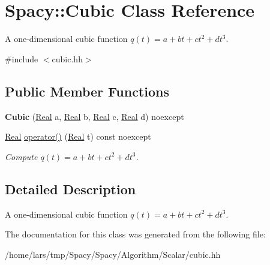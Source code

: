 \hypertarget{classSpacy_1_1Cubic}{}\section{Spacy\+:\+:Cubic Class Reference}
\label{classSpacy_1_1Cubic}


A one-\/dimensional cubic function $q(t) = a + bt + ct^2 + dt^3$.  




{\ttfamily \#include $<$cubic.\+hh$>$}

\subsection*{Public Member Functions}
\begin{DoxyCompactItemize}
\item 
{\bfseries Cubic} (\hyperlink{classSpacy_1_1Real}{Real} a, \hyperlink{classSpacy_1_1Real}{Real} b, \hyperlink{classSpacy_1_1Real}{Real} c, \hyperlink{classSpacy_1_1Real}{Real} d) noexcept\hypertarget{classSpacy_1_1Cubic_aa0893e2540b9f5ac4b85e168c1f7d6d4}{}\label{classSpacy_1_1Cubic_aa0893e2540b9f5ac4b85e168c1f7d6d4}

\item 
\hyperlink{classSpacy_1_1Real}{Real} \hyperlink{classSpacy_1_1Cubic_af2c7cb43b2d55bad525ade5caafe898e}{operator()} (\hyperlink{classSpacy_1_1Real}{Real} t) const noexcept\hypertarget{classSpacy_1_1Cubic_af2c7cb43b2d55bad525ade5caafe898e}{}\label{classSpacy_1_1Cubic_af2c7cb43b2d55bad525ade5caafe898e}

\begin{DoxyCompactList}\small\item\em Compute $q(t) = a + bt + ct^2 + dt^3 $. \end{DoxyCompactList}\end{DoxyCompactItemize}


\subsection{Detailed Description}
A one-\/dimensional cubic function $q(t) = a + bt + ct^2 + dt^3$. 

The documentation for this class was generated from the following file\+:\begin{DoxyCompactItemize}
\item 
/home/lars/tmp/\+Spacy/\+Spacy/\+Algorithm/\+Scalar/cubic.\+hh\end{DoxyCompactItemize}
